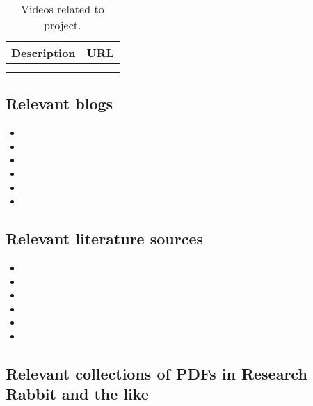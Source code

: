 \documentclass[11pt,letterpaper]{article}
\begin{document}
\begin{table}[htbp]
\caption[Related videos]{Videos related to project.}
\centering
\begin{tabular}{ll}
Description & URL\\[0pt]
\hline
 & \\[0pt]
 & \\[0pt]
\end{tabular}
\end{table}


\subsection{Relevant blogs}
\label{sec:org1ea7417}
\begin{itemize}
\item 

\item 

\item 

\item 

\item 

\item 
\end{itemize}


\subsection{Relevant literature sources}
\label{sec:orgfaf2ecf}

\begin{itemize}
\item 

\item 

\item 

\item 

\item 

\item 
\end{itemize}

\subsection{Relevant collections of PDFs in Research Rabbit and the like}
\label{sec:org92c5c67}
\end{document}
